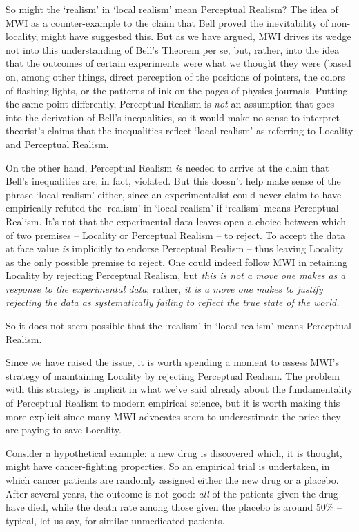 \documentclass[12pt]{article}
\begin{document}
So might the `realism' in `local realism' mean Perceptual Realism?
The idea of MWI as a counter-example to the claim that Bell proved the
inevitability of non-locality, might have suggested this.  But as we
have argued, MWI drives its wedge not into this understanding of
Bell's Theorem per se, but, rather, into the idea that the outcomes of
certain experiments were what we thought they were (based on, among
other things, direct perception of the positions of pointers, the
colors of flashing lights, or the patterns of ink on the pages of
physics journals.  Putting the
same point differently, Perceptual Realism is \emph{not} an assumption
that goes into the derivation of Bell's inequalities, so it would make
no sense to interpret theorist's claims that the inequalities reflect
`local realism' as referring to Locality and Perceptual Realism.  

On the other hand, Perceptual Realism \emph{is} needed to arrive at
the claim that Bell's inequalities are, in fact, violated.  But this
doesn't help make sense of the phrase `local realism' either, since
an experimentalist could never claim to have empirically refuted
the `realism' in  
`local realism' if `realism' means Perceptual Realism.  It's not
that the experimental data leaves open a choice between which of two
premises -- Locality or Perceptual Realism -- to reject.  To accept
the data at face value 
\emph{is} implicitly to endorse Perceptual Realism -- thus leaving
Locality as the only possible premise to reject.  One could indeed
follow MWI in retaining Locality by rejecting Perceptual Realism,
but \emph{this is not a move one makes as a response to the experimental 
data}; rather, \emph{it is a move one makes to justify rejecting the data as
systematically failing to reflect the true state of the world.}

So it does not seem possible that the `realism' in `local realism'
means Perceptual Realism.

Since we have raised the issue, it is worth spending a moment to
assess MWI's strategy of maintaining Locality by rejecting
Perceptual Realism.  The problem with this strategy is implicit in
what we've said already about the fundamentality of Perceptual Realism
to modern empirical science, but it is worth making this more
explicit since many MWI advocates seem to underestimate the price they
are paying to save Locality.  

Consider a hypothetical example:  a new drug is discovered
which, it is thought, might have cancer-fighting properties.  So an
empirical trial is undertaken, in which cancer patients are randomly
assigned either the new drug or a placebo.  After several years, the
outcome is not good:  \emph{all} of the patients given the drug have died,
while the death rate among those given the placebo is around 50\% --
typical, let us say, for similar unmedicated patients.  
\end{document}
